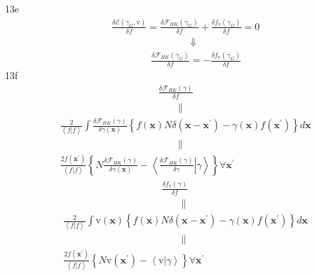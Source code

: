 \documentclass[aps,preprint]{revtex4}%
\begin{document}
13e%
\begin{align*}
&  \left.  \frac{\delta\mathcal{E}\left(  \gamma_{G}\mathbf{,}\mathrm{v}%
\right)  }{\delta f}=\frac{\delta\mathcal{F}_{HK}\left(  \gamma_{G}\right)
}{\delta f}+\frac{\delta f_{\mathrm{v}}\left(  \gamma_{G}\right)  }{\delta
f}=0\right.  \\
&  \qquad\qquad\qquad\qquad\left.  \Downarrow\right.  \\
&  \qquad\qquad\left.  \frac{\delta\mathcal{F}_{HK}\left(  \gamma_{G}\right)
}{\delta f}=-\frac{\delta f_{\mathrm{v}}\left(  \gamma_{G}\right)  }{\delta
f}\right.
\end{align*}
13f%
\begin{align*}
&  \qquad\qquad\qquad\qquad\qquad\left.  \frac{\delta\mathcal{F}_{HK}\left(
\gamma\right)  }{\delta f}\right.  \\
&  \qquad\qquad\qquad\qquad\qquad\qquad\left.  \parallel\right.  \\
&  \left.  \frac{2}{\left\langle f|f\right\rangle }\int\frac{\delta
\mathcal{F}_{HK}\left(  \gamma\right)  }{\delta\gamma\left(  \mathbf{x}%
\right)  }\left\{  f\left(  \mathbf{x}\right)  N\delta\left(  \mathbf{x-x}%
^{\prime}\right)  -\gamma\left(  \mathbf{x}\right)  f\left(  \mathbf{x}%
^{\prime}\right)  \right\}  d\mathbf{x}\right.  \\
&  \qquad\qquad\qquad\qquad\qquad\qquad\left.  \parallel\right.  \\
&  \frac{2f\left(  \mathbf{x}^{\prime}\right)  }{\left\langle f|f\right\rangle
}\left\{  N\frac{\delta\mathcal{F}_{HK}\left(  \gamma\right)  }{\delta
\gamma\left(  \mathbf{x}\right)  }-\left\langle \left.  \frac{\delta
\mathcal{F}_{HK}\left(  \gamma\right)  }{\delta\gamma}\right\vert
\gamma\right\rangle \right\}  \forall\mathbf{x}^{\prime}%
\end{align*}%
\begin{align*}
&  \qquad\qquad\qquad\qquad\qquad\left.  \frac{\delta f_{\mathrm{v}}\left(
\gamma\right)  }{\delta f}\right.  \\
&  \qquad\qquad\qquad\qquad\qquad\qquad\left.  \parallel\right.  \\
&  \left.  \frac{2}{\left\langle f|f\right\rangle }\int\mathrm{v}\left(
\mathbf{x}\right)  \left\{  f\left(  \mathbf{x}\right)  N\delta\left(
\mathbf{x-x}^{\prime}\right)  -\gamma\left(  \mathbf{x}\right)  f\left(
\mathbf{x}^{\prime}\right)  \right\}  d\mathbf{x}\right.  \\
&  \qquad\qquad\qquad\qquad\qquad\qquad\left.  \parallel\right.  \\
&  \frac{2f\left(  \mathbf{x}^{\prime}\right)  }{\left\langle f|f\right\rangle
}\left\{  N\mathrm{v}\left(  \mathbf{x}^{\prime}\right)  -\left\langle \left.
\mathrm{v}\right\vert \gamma\right\rangle \right\}  \forall\mathbf{x}^{\prime}%
\end{align*}
\end{document}
